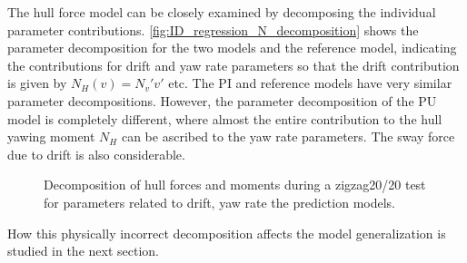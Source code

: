 The hull force model can be closely examined by decomposing the individual parameter contributions. \autoref{fig:ID_regression_N_decomposition} shows the parameter decomposition for the two models and the reference model, indicating the contributions for drift and yaw rate parameters so that the drift contribution is given by $N_H(v)={N_v}'v'$ etc. The PI  and reference models have very similar parameter decompositions.
However, the parameter decomposition of the PU model is completely different, where almost the entire contribution to the hull yawing moment $N_H$ can be ascribed to the yaw rate parameters. The sway force due to drift is also considerable.  
\begin{figure}[h]
    \begin{center}
        
        \caption{Decomposition of hull forces and moments during a zigzag20/20 test for parameters related to drift, yaw rate the prediction models.}
        \label{fig:ID_regression_N_decomposition}
    \end{center}
\end{figure}
How this physically incorrect decomposition affects the model generalization is studied in the next section.